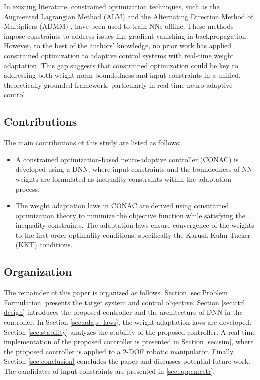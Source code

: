 \documentclass[lettersize,journal]{IEEEtran}
\begin{document}
In existing literature, constrained optimization techniques, such as the Augmented Lagrangian Method (ALM) \cite{Evens:2021aa} and the Alternating Direction Method of Multipliers (ADMM) \cite{Wang:2019aa,Taylor:2016aa}, have been used to train NNs offline. 
These methods impose constraints to address issues like gradient vanishing in backpropagation. 
However, to the best of the authors' knowledge, no prior work has applied constrained optimization to adaptive control systems with real-time weight adaptation. 
This gap suggests that constrained optimization could be key to addressing both weight norm boundedness and input constraints in a unified, theoretically grounded framework, particularly in real-time neuro-adaptive control.

\subsection{Contributions}

The main contributions of this study are listed as follows:
\begin{itemize}
    \item A constrained optimization-based neuro-adaptive controller (CONAC) is developed using a DNN, where input constraints and the boundedness of NN weights are formulated as inequality constraints within the adaptation process.
    \item The weight adaptation laws in CONAC are derived using constrained optimization theory to minimize the objective function while satisfying the inequality constraints. The adaptation laws ensure convergence of the weights to the first-order optimality conditions, specifically the Karush-Kuhn-Tucker (KKT) conditions.
\end{itemize}

\subsection{Organization}

The remainder of this paper is organized as follows. 
Section \ref{sec:Problem Formulation} presents the target system and control objective.
Section \ref{sec:ctrl design} introduces the proposed controller and the architecture of DNN in the controller. 
In Section \ref{sec:adap_laws}, the weight adaptation laws are developed.
Section \ref{sec:stability} analyzes the stability of the proposed controller.
A real-time implementation of the proposed controller is presented in Section \ref{sec:sim}, where the proposed controller is applied to a 2-DOF robotic manipulator.
Finally, Section \ref{sec:conclusion} concludes the paper and discusses potential future work.
The candidates of input constraints are presented in \ref{sec:appen:cstr}.
\end{document}
